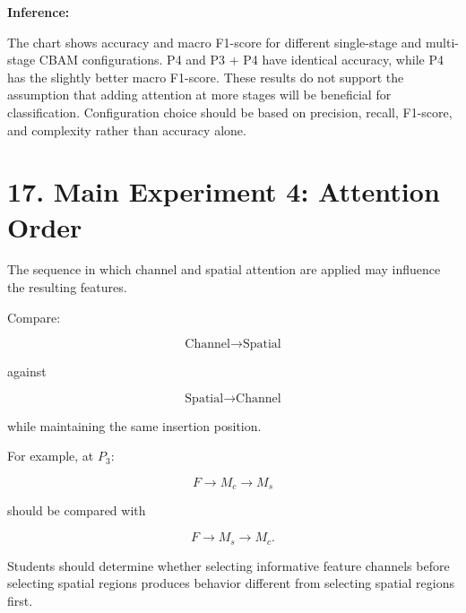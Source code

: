 \documentclass[10pt]{article}
\begin{document}
\textbf{Inference:}

The chart shows accuracy and macro F1-score for different single-stage and multi-stage CBAM configurations. P4 and P3 + P4 have identical accuracy, while P4 has the slightly better macro F1-score. These results do not support the assumption that adding attention at more stages will be beneficial for classification. Configuration choice should be based on precision, recall, F1-score, and complexity rather than accuracy alone.

\section*{17. Main Experiment 4: Attention Order}

The sequence in which channel and spatial attention are applied may influence
the resulting features.

Compare:

\[
\boxed{
\text{Channel}
\rightarrow
\text{Spatial}
}
\]

against

\[
\boxed{
\text{Spatial}
\rightarrow
\text{Channel}
}
\]

while maintaining the same insertion position.

For example, at $P_3$:

\[
F
\rightarrow
M_c
\rightarrow
M_s
\]

should be compared with

\[
F
\rightarrow
M_s
\rightarrow
M_c.
\]

Students should determine whether selecting informative feature channels
before selecting spatial regions produces behavior different from selecting
spatial regions first.

\begin{table}[H]
\centering
\caption{Effect of Attention Order on Classification Performance at $P_3$}
\label{tab:attention_order}
\end{table}
\end{document}
